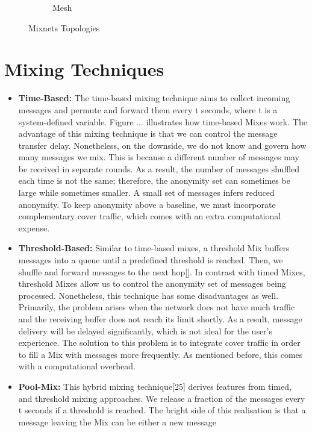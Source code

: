 \documentclass[logo,msc,cyber]{infthesis}   %
\begin{document}
\begin{figure}[h!]
\begin{subfigure}[b]{0.45\textwidth}
        \caption{Mesh}
        \label{fig:mesh}
    \end{subfigure}
       \caption{Mixnets Topologies}
       \label{fig:mixnets-topologies}
\end{figure}

\section{Mixing Techniques}

\begin{itemize}
   \item \textbf{Time-Based:} The time-based mixing technique aims to collect
   incoming messages and permute and forward them every t seconds, where t is a
   system-defined variable. Figure ... illustrates how time-based Mixes work.
   The advantage of this mixing technique is that we can control the message
   transfer delay. Nonetheless, on the downside, we do not know and govern how
   many messages we mix. This is because a different number of messages may be
   received in separate rounds. As a result, the number of messages shuffled
   each time is not the same; therefore, the anonymity set can sometimes be
   large while sometimes smaller. A small set of messages infers reduced
   anonymity. To keep anonymity above a baseline, we must incorporate
   complementary cover traffic, which comes with an extra computational expense. 
   \item \textbf{Threshold-Based:} Similar to time-based mixes, a threshold Mix buffers
   messages into a queue until a predefined threshold is reached. Then, we
   shuffle and forward messages to the next hop[]. In contrast with timed Mixes,
   threshold Mixes allow us to control the anonymity set of messages being
   processed. Nonetheless, this technique has some disadvantages as well.
   Primarily, the problem arises when the network does not have much traffic and
   the receiving buffer does not reach its limit shortly. As a result, message
   delivery will be delayed significantly, which is not ideal for the user's
   experience. The solution to this problem is to integrate cover traffic in
   order to fill a Mix with messages more frequently. As mentioned before, this
   comes with a computational overhead.
   \item \textbf{Pool-Mix:} This hybrid mixing technique[25] derives features
   from timed, and threshold mixing approaches. We release a fraction of the
   messages every t seconds if a threshold is reached. The bright side of this
   realisation is that a message leaving the Mix can be either a new message

\end{itemize}
\end{document}
